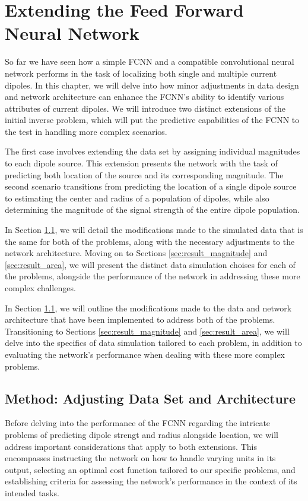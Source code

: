 \documentclass[a4paper, UKenglish, 11pt]{uiomaster}
\begin{document}
\chapter{Extending the Feed Forward Neural Network} \label{chap:extended_FFNN}
So far we have seen how a simple FCNN and a compatible convolutional neural network performs in the task of localizing both single and multiple current dipoles. In this chapter, we will delve into how minor adjustments in data design and network architecture can enhance the FCNN's ability to identify various attributes of current dipoles. We will introduce two distinct extensions of the initial inverse problem, which will put the predictive capabilities of the FCNN to the test in handling more complex scenarios.

The first case involves extending the data set by assigning individual magnitudes to each dipole source. This extension presents the network with the task of predicting both location of the source and its corresponding magnitude. The second scenario transitions from predicting the location of a single dipole source to estimating the center and radius of a population of dipoles, while also determining the magnitude of the signal strength of the entire dipole population.

In Section \ref{sec:method}, we will detail the modifications made to the simulated data that is the same for both of the problems, along with the necessary adjustments to the network architecture. Moving on to Sections \ref{sec:result_magnitude} and \ref{sec:result_area}, we will present the distinct data simulation choises for each of the problems, alongside the performance of the network in addressing these more complex challenges.

In Section \ref{sec:method}, we will outline the modifications made to the data and network architecture that have been implemented to address both of the problems. Transitioning to Sections \ref{sec:result_magnitude} and \ref{sec:result_area}, we will delve into the specifics of data simulation tailored to each problem, in addition to evaluating the network's performance when dealing with these more complex problems.


\section{Method: Adjusting Data Set and Architecture} \label{sec:method}
Before delving into the performance of the FCNN regarding the intricate problems of predicting dipole strengt and radius alongside location, we will address important considerations that apply to both extensions. This encompasses instructing the network on how to handle varying units in its output, selecting an optimal cost function tailored to our specific problems, and establishing criteria for assessing the network's performance in the context of its intended tasks.
\end{document}
